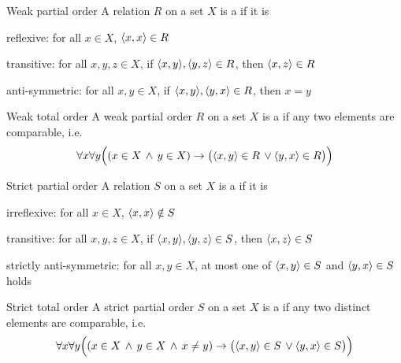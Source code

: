 \documentclass{styles/tufte}
\begin{document}
  \begin{definition}{Weak partial order}{}
    A relation $R$ on a set $X$ is a  if it is
    \begin{romanenum}
      \item reflexive: for all $x \in X$, $\langle x, x\rangle \in R$
      \item transitive: for all $x, y, z \in X$, if $\langle x, y\rangle, \langle y, z\rangle \in R$, then $\langle x, z\rangle \in R$
      \item anti-symmetric: for all $x, y \in X$, if $\langle x, y\rangle, \langle y, x\rangle \in R$, then $x = y$
    \end{romanenum}
  \end{definition}
  
  \begin{definition}{Weak total order}{}
    A weak partial order $R$ on a set $X$ is a  if any two elements are comparable, i.e.
    \[ \forall x \forall y \left((x \in X \,\land\, y \in X) \implies \left(\opair{x, y} \in R \,\lor \opair{y, x} \in R\right)\right) \]
  \end{definition}
  
  \begin{definition}{Strict partial order}{}
    A relation $S$ on a set $X$ is a  if it is
    \begin{romanenum}
      \item irreflexive: for all $x \in X$, $\langle x, x\rangle \notin S$
      \item transitive: for all $x, y, z \in X$, if $\langle x, y\rangle, \langle y, z\rangle \in S$, then $\langle x, z\rangle \in S$
      \item *strictly anti-symmetric: for all $x, y \in X$, at most one of $\langle x, y\rangle \in S$ and $\langle y, x\rangle \in S$ holds
    \end{romanenum}
  \end{definition}
  
  \begin{definition}{Strict total order}{}
    A strict partial order $S$ on a set $X$ is a  if any two distinct elements are comparable, i.e.
    \[ \forall x \forall y \left((x \in X \,\land\, y \in X \,\land\, x \neq y) \implies \left(\opair{x, y} \in S \,\lor \opair{y, x} \in S\right)\right) \]
  \end{definition}
  
\end{document}
